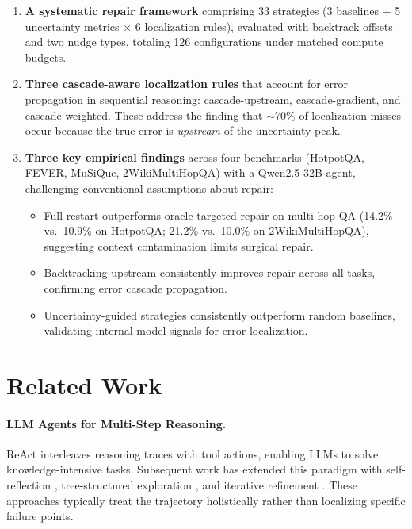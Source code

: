 \documentclass[letterpaper]{article}
\begin{document}
\begin{enumerate}
  \item \textbf{A systematic repair framework} comprising 33 strategies (3 baselines + 5 uncertainty metrics $\times$ 6 localization rules), evaluated with backtrack offsets and two nudge types, totaling 126 configurations under matched compute budgets.

  \item \textbf{Three cascade-aware localization rules} that account for error propagation in sequential reasoning: cascade-upstream, cascade-gradient, and cascade-weighted. These address the finding that $\sim$70\% of localization misses occur because the true error is \emph{upstream} of the uncertainty peak.

  \item \textbf{Three key empirical findings} across four benchmarks (HotpotQA, FEVER, MuSiQue, 2WikiMultiHopQA) with a Qwen2.5-32B agent, challenging conventional assumptions about repair:
  \begin{itemize}
    \item Full restart outperforms oracle-targeted repair on multi-hop QA (14.2\% vs.\ 10.9\% on HotpotQA; 21.2\% vs.\ 10.0\% on 2WikiMultiHopQA), suggesting context contamination limits surgical repair.
    \item Backtracking upstream consistently improves repair across all tasks, confirming error cascade propagation.
    \item Uncertainty-guided strategies consistently outperform random baselines, validating internal model signals for error localization.
  \end{itemize}
\end{enumerate}

\section{Related Work}

\paragraph{LLM Agents for Multi-Step Reasoning.}
ReAct \citep{yao2023react} interleaves reasoning traces with tool actions, enabling LLMs to solve knowledge-intensive tasks. Subsequent work has extended this paradigm with self-reflection \citep{shinn2023reflexion}, tree-structured exploration \citep{yao2023tree}, and iterative refinement \citep{madaan2023selfrefine}. These approaches typically treat the trajectory holistically rather than localizing specific failure points.
\end{document}
